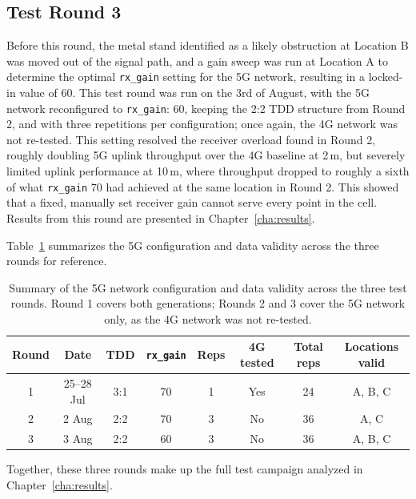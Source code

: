 \subsection{Test Round 3}
\label{sec:test-round-3}

Before this round, the metal stand identified as a likely obstruction at Location B was moved out of the signal path, and a gain sweep was run at Location A to determine the optimal \texttt{rx\_gain} setting for the 5G network, resulting in a locked-in value of 60. This test round was run on the 3rd of August, with the 5G network reconfigured to \texttt{rx\_gain}: 60, keeping the 2:2 \gls{TDD} structure from Round 2, and with three repetitions per configuration; once again, the 4G network was not re-tested. This setting resolved the receiver overload found in Round 2, roughly doubling 5G uplink throughput over the 4G baseline at 2\,m, but severely limited uplink performance at 10\,m, where throughput dropped to roughly a sixth of what \texttt{rx\_gain} 70 had achieved at the same location in Round 2. This showed that a fixed, manually set receiver gain cannot serve every point in the cell. Results from this round are presented in Chapter~\ref{cha:results}.

Table~\ref{tab:test-rounds-summary} summarizes the 5G configuration and data validity across the three rounds for reference.

\begin{table}[htbp]
    \centering
    \begin{tabular}{|c|c|c|c|c|c|c|c|}
        \hline
        \textbf{Round} & \textbf{Date} & \textbf{TDD} & \textbf{\texttt{rx\_gain}} & \textbf{Reps} & \textbf{4G tested} & \textbf{Total reps} & \textbf{Locations valid} \\
        \hline
        1 & 25--28 Jul & 3:1 & 70 & 1 & Yes & 24 & A, B, C \\
        \hline
        2 & 2 Aug & 2:2 & 70 & 3 & No & 36 & A, C \\
        \hline
        3 & 3 Aug & 2:2 & 60 & 3 & No & 36 & A, B, C \\
        \hline
    \end{tabular}
    \caption[5G configuration and data validity across the three rounds.]{Summary of the 5G network configuration and data validity across the three test rounds. Round 1 covers both generations; Rounds 2 and 3 cover the 5G network only, as the 4G network was not re-tested.}
    \label{tab:test-rounds-summary}
\end{table}

Together, these three rounds make up the full test campaign analyzed in Chapter~\ref{cha:results}.
